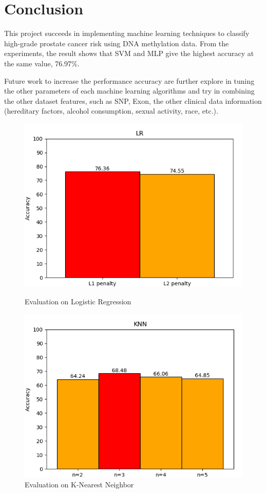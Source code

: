 \documentclass[a4paper,oneside]{article}
\begin{document}
\section{Conclusion}
This project succeeds in implementing machine learning techniques to classify high-grade prostate cancer risk using DNA methylation data. From the experiments, the result shows that SVM and MLP give the highest accuracy at the same value, 76.97\%.
\par
Future work to increase the performance accuracy are further explore in tuning the other parameters of each machine learning algorithms and try in combining the other dataset features, such as SNP, Exon, the other clinical data information (hereditary factors, alcohol consumption, sexual activity, race, etc.).

\begin{figure}[h]
	\centering
	\begin{minipage}[t]{8.6cm}
\includegraphics[width=1\linewidth]{LR}
  \centering
  \caption{Evaluation on Logistic Regression}
  \label{fig:LR}
	\end{minipage}
	\begin{minipage}[t]{8.6cm}
	\includegraphics[width=1\linewidth]{KNN}
  \centering
  \caption{Evaluation on K-Nearest Neighbor}
  \label{fig:KNN}
	\end{minipage}
\end{figure}
\end{document}
